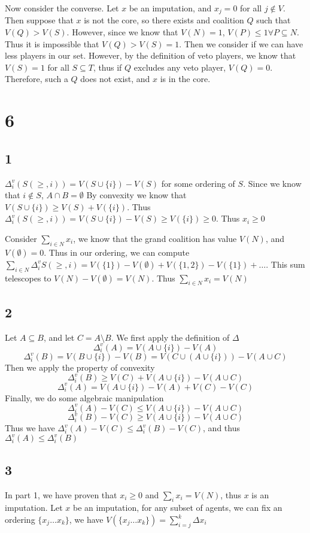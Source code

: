 \documentclass[12pt]{article}
\begin{document}
Now consider the converse. Let $x$ be an imputation, and $x_j = 0$ for all $j \not\in V$. Then suppose that $x$ is not the core, so there exists and coalition $Q$ such 
that $V(Q) > V(S)$. However, since we know that $V(N) = 1$, $V(P) \leq 1 \forall P \subseteq N$. Thus it is impossible that 
$V(Q) > V(S) = 1$. Then we consider if we can have less players in our set. However, by the definition of veto players, 
we know that $V(S) = 1$ for all $S \subseteq T$, thus if $Q$ excludes any veto player, $V(Q) = 0$.
Therefore, such a $Q$ does not exist, and $x$ is in the core.


\newpage
\section*{6}

\subsection*{1}
$\Delta_i^v(S(\geq, i)) = V(S\cup\{i\}) - V(S)$ for some ordering of $S$. Since we know that $i \not\in S$, $A\cap B = \emptyset$
By convexity we know that $V(S\cup\{i\}) \geq V(S) + V(\{i\})$. Thus $\Delta_i^v(S(\geq, i)) = V(S\cup\{i\}) - V(S) \geq V(\{i\}) \geq 0$.
Thus $x_i \geq 0$

Consider $\sum_{i \in N}x_i$, we know that the grand coalition has value $V(N)$, and $V(\emptyset) = 0$. Thus in our ordering, 
we can compute $\sum_{i \in N}\Delta_i^v S(\geq, i) = V(\{1\}) - V(\emptyset)+V(\{1,2\}) - V(\{1\}) + \ldots$. 
This sum telescopes to $V(N) - V(\emptyset) = V(N)$. Thus $\sum_{i \in N}x_i = V(N)$
\subsection*{2}
Let $A\subseteq B$, and let $C = A \setminus B$. 
We first apply the definition of $\Delta$
\[\Delta_i^v(A) = V(A\cup\{i\}) - V(A)\]
\[\Delta_i^v(B) = V(B\cup\{i\}) - V(B) = V(C\cup (A \cup\{i\})) - V(A \cup C)\]
Then we apply the property of convexity
\[\Delta_i^v(B) \geq V(C)+V(A \cup\{i\}) - V(A\cup C)\]
\[\Delta_i^v(A) = V(A\cup\{i\}) - V(A) + V(C) - V(C)\]
Finally, we do some algebraic manipulation
\[\Delta_i^v(A)-V(C) \leq V(A\cup\{i\}) - V(A \cup C)\]
\[\Delta_i^v(B)-V(C) \geq V(A \cup \{i\}) - V(A\cup C)\]
Thus we have $\Delta_i^v(A)-V(C) \leq \Delta_i^v(B)-V(C)$, and thus $\Delta_i^v(A) \leq \Delta_i^v(B)$

\subsection*{3}
In part 1, we have proven that $x_i \geq 0$ and $\sum_i x_i = V(N)$, thus $x$ is an imputation.
Let $x$ be an imputation, for any subset of agents, we can fix an ordering $\{x_j \ldots x_k\}$, we have $V(\{x_j \ldots x_k\}) = \sum_{i=j}^k \Delta x_i$
\end{document}
